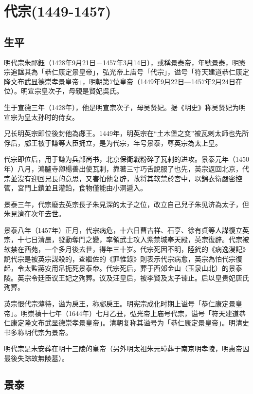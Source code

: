 
\section{代宗\tiny(1449-1457)}

\subsection{生平}

明代宗朱祁鈺（1428年9月21日－1457年3月14日），或稱景泰帝，年號景泰，明憲宗追諡其為「恭仁康定景皇帝」，弘光帝上庙号「代宗」，谥号「符天建道恭仁康定隆文布武显德崇孝景皇帝」，明朝第7位皇帝（1449年9月22日—1457年2月24日在位）。明宣宗皇次子，母親是賢妃吳氏。

生于宣德三年（1428年），他是明宣宗次子，母吴贤妃。据《明史》称吴贤妃为明宣宗为皇太孙时的侍女。

兄长明英宗即位後封他為郕王。1449年，明英宗在“土木堡之变”被瓦剌太師也先所俘后，郕王被于謙等大臣拥立，是为代宗，年号景泰，尊英宗為太上皇。

代宗即位后，用于謙为兵部尚书，北京保衛戰粉碎了瓦剌的进攻。景泰元年（1450年）八月，鴻臚寺卿楊善出使瓦剌，靠著三寸巧舌說服了也先，英宗返回北京，代宗並沒有迎回兄長的意思，又害怕他复辟，故将其软禁於宮中，以錦衣衛嚴密控管，宮門上鎖並且灌鉛，食物僅能由小洞遞入。

景泰三年，代宗廢去英宗長子朱見深的太子之位，改立自己兒子朱见济為太子，但朱見濟在次年去世。

景泰八年（1457年）正月，代宗病危，十六日曹吉祥、石亨、徐有貞等人謀復立英宗，十七日清晨，發動奪門之變，率領武士攻入紫禁城奉天殿，英宗復辟。代宗被软禁在西苑，一个多月後去世，得年三十岁。代宗死因不明，陸釴的《病逸漫記》說代宗是被英宗謀殺的，查繼佐的《罪惟錄》則表示代宗病愈，英宗為怕代宗復起，令太監蔣安用帛扼死景泰帝。代宗死后，葬于西郊金山（玉泉山北）的景泰陵。英宗令廷臣议王妃之殉葬。议及汪皇后，被李賢及太子谏止。后以皇贵妃唐氏殉葬。

英宗恨代宗薄待，谥为戾王，称郕戾王。明宪宗成化时期上谥号「恭仁康定景皇帝」。明崇禎十七年（1644年）七月乙丑，弘光帝上庙号代宗，谥号「符天建道恭仁康定隆文布武显德崇孝景皇帝」。清朝复称其谥号为「恭仁康定景皇帝」。明清史书多称明代宗为景帝。

明代宗是未安葬在明十三陵的皇帝（另外明太祖朱元璋葬于南京明孝陵，明惠帝因最後失踪故無陵墓）。

\subsection{景泰}

